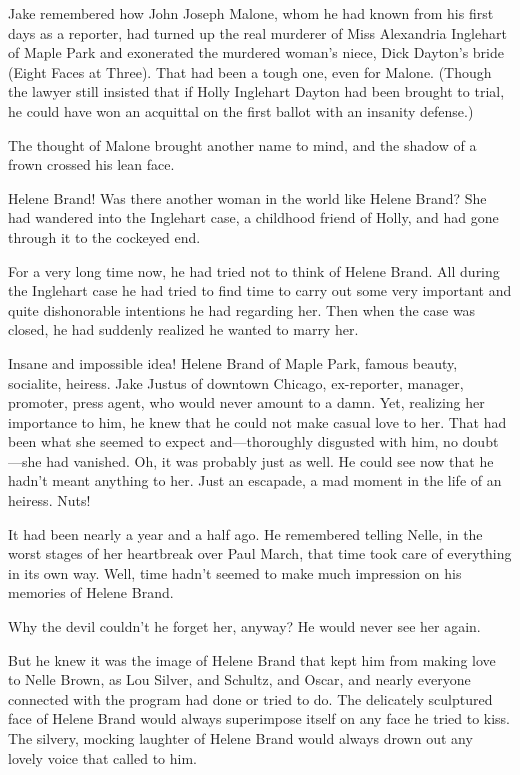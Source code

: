 \documentclass{novel}
\begin{document}
Jake remembered how John Joseph Malone, whom he had known from his first days as a reporter, had turned up the real murderer of Miss Alexandria Inglehart of Maple Park and exonerated the murdered woman’s niece, Dick Dayton’s bride (Eight Faces at Three). That had been a tough one, even for Malone. (Though the lawyer still insisted that if Holly Inglehart Dayton had been brought to trial, he could have won an acquittal on the first ballot with an insanity defense.)

The thought of Malone brought another name to mind, and the shadow of a frown crossed his lean face.

Helene Brand! Was there another woman in the world like Helene Brand? She had wandered into the Inglehart case, a childhood friend of Holly, and had gone through it to the cockeyed end.

For a very long time now, he had tried not to think of Helene Brand. All during the Inglehart case he had tried to find time to carry out some very important and quite dishonorable intentions he had regarding her. Then when the case was closed, he had suddenly realized he wanted to marry her.

Insane and impossible idea! Helene Brand of Maple Park, famous beauty, socialite, heiress. Jake Justus of downtown Chicago, ex-reporter, manager, promoter, press agent, who would never amount to a damn. Yet, realizing her importance to him, he knew that he could not make casual love to her. That had been what she seemed to expect and—thoroughly disgusted with him, no doubt—she had vanished. Oh, it was probably just as well. He could see now that he hadn’t meant anything to her. Just an escapade, a mad moment in the life of an heiress. Nuts!

It had been nearly a year and a half ago. He remembered telling Nelle, in the worst stages of her heartbreak over Paul March, that time took care of everything in its own way. Well, time hadn’t seemed to make much impression on his memories of Helene Brand.

Why the devil couldn’t he forget her, anyway? He would never see her again.

But he knew it was the image of Helene Brand that kept him from making love to Nelle Brown, as Lou Silver, and Schultz, and Oscar, and nearly everyone connected with the program had done or tried to do. The delicately sculptured face of Helene Brand would always superimpose itself on any face he tried to kiss. The silvery, mocking laughter of Helene Brand would always drown out any lovely voice that called to him.
\end{document}
